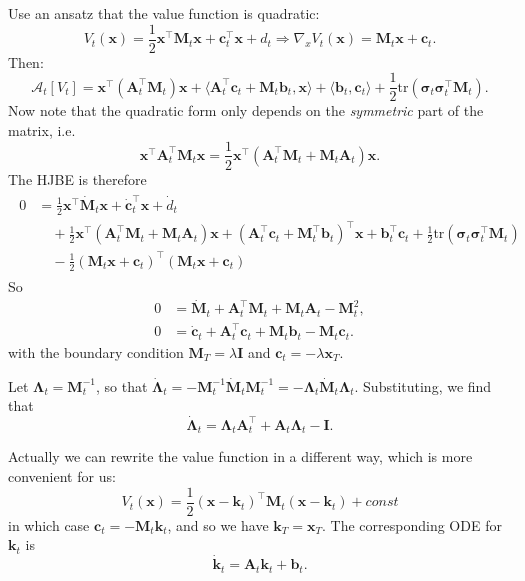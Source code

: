 \documentclass{article}
\newcommand{\tr}{\mathrm{tr}}
\newcommand{\Id}{\mathbf{I}}
\theoremstyle{newstyle}
\begin{document}
Use an ansatz that the value function is quadratic:
\begin{equation}
  V_t(\bm{x}) = \frac{1}{2} \bm{x}^\top \bm{M}_t \bm{x} + \bm{c}_t^\top \bm{x} + d_t \Longrightarrow \nabla_x V_t(\bm{x}) = \bm{M}_t \bm{x} + \bm{c}_t.  
\end{equation}
Then:
\begin{equation}
  \mathcal{A}_t[V_t] = \bm{x}^\top (\bm{A}_t^\top \bm{M}_t) \bm{x} + \langle \bm{A}_t^\top \bm{c}_t + \bm{M}_t \bm{b}_t, \bm{x} \rangle + \langle \bm{b}_t, \bm{c}_t \rangle + \frac{1}{2} \tr (\bm{\sigma}_t \bm{\sigma}_t^\top \bm{M}_t). 
\end{equation}
Now note that the quadratic form only depends on the \emph{symmetric} part of the matrix, i.e.
\[
  \bm{x}^\top \bm{A}_t^\top \bm{M}_t \bm{x} = \frac{1}{2} \bm{x}^\top \left( \bm{A}_t^\top \bm{M}_t + \bm{M}_t \bm{A}_t \right) \bm{x}. 
\]
The HJBE is therefore
\begin{align}
  \begin{split}
  0 &= \frac{1}{2} \bm{x}^\top \dot{\bm{M}}_t \bm{x} + \dot{\bm{c}}_t^\top \bm{x} + \dot{d}_t  \\
    &\quad + \frac{1}{2} \bm{x}^\top (\bm{A}_t^\top \bm{M}_t + \bm{M}_t \bm{A}_t) \bm{x} + (\bm{A}_t^\top \bm{c}_t + \bm{M}_t^\top \bm{b}_t)^\top \bm{x} + \bm{b}_t^\top \bm{c}_t + \frac{1}{2} \tr(\bm{\sigma}_t \bm{\sigma}_t^\top \bm{M}_t) \\
    &\quad - \frac{1}{2} (\bm{M}_t \bm{x} + \bm{c}_t)^\top (\bm{M}_t \bm{x} + \bm{c}_t)
  \end{split}
\end{align}
So
\begin{align}
  0 &= \dot{\bm{M}}_t + \bm{A}_t^\top \bm{M}_t + \bm{M}_t \bm{A}_t - \bm{M}_t^2,  \\
  0 &= \dot{\bm{c}}_t + \bm{A}_t^\top \bm{c}_t + \bm{M}_t \bm{b}_t - \bm{M}_t \bm{c}_t. 
\end{align}
with the boundary condition $\bm{M}_T = \lambda \Id$ and $\bm{c}_t = -\lambda \bm{x}_T$.

Let $\bm{\Lambda}_t = \bm{M}_t^{-1}$, so that $\dot{\bm{\Lambda}}_t = -\bm{M}_t^{-1} \dot{\bm{M}}_t \bm{M}_t^{-1} = -\bm{\Lambda}_t \dot{\bm{M}}_t \bm{\Lambda}_t$. Substituting, we find that
\begin{equation}
  \dot{\bm{\Lambda}}_t = \bm{\Lambda}_t \bm{A}_t^\top + \bm{A}_t \bm{\Lambda}_t - \Id. 
\end{equation}

Actually we can rewrite the value function in a different way, which is more convenient for us:
\[
  V_t(\bm{x}) = \frac{1}{2} (\bm{x} - \bm{k}_t)^\top \bm{M}_t (\bm{x} - \bm{k}_t) + const
\]
in which case $\bm{c}_t = -\bm{M}_t \bm{k}_t$, and so we have $\bm{k}_T = \bm{x}_T$. The corresponding ODE for $\bm{k}_t$ is
\begin{equation}
  \dot{\bm{k}}_t = \bm{A}_t \bm{k}_t + \bm{b}_t. 
\end{equation}
\end{document}
